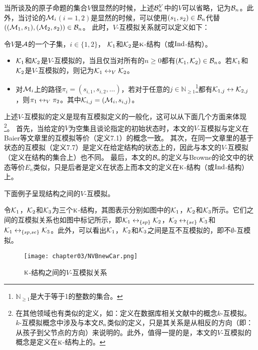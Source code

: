 当所谈及的原子命题的集合$V$很显然的时候，上述${\cal B}_n^V$中的$V$可以省略，记为${\cal B}_n$。此外，当讨论的${\cal M}_i$$(i=1,2)$是显然的时候，可以使用$(s_1,s_2) \in {\cal B}_n$代替$(({\cal M}_1,s_1),({\cal M}_2,s_2)) \in {\cal B}_n$。
此时，$V$-互模拟关系就可以定义如下：
\begin{definition}[$V$-互模拟]\label{def:V-bisimulation}
	令$V$是${\cal A}$的一个子集，$i\in \{1,2\}$， ${\cal K}_1$和${\cal K}_2$是$\textsc{k}$-结构（或$\textrm{Ind}$-结构）。
	\begin{itemize}
		\item ${\cal K}_1$和${\cal K}_2$是$V$-互模拟的，当且仅当对所有的$n \ge 0$都有$({\cal K}_1, {\cal K}_2)\in {\cal B}_n$。若${\cal K}_1$和${\cal K}_2$是$V$-互模拟的，则记为${\cal K}_1 \leftrightarrow_V {\cal K}_2$。
		\item 对${\cal M}_i$上的路径$\pi_i=(s_{i,1},s_{i,2},\dots)$，若对于任意的$j\in \mathbb{N}_{\ge 1}$\footnote{$\mathbb{N}_{\ge 1}$是大于等于1的整数的集合。}都有${\cal K}_{1,j} \leftrightarrow {\cal K}_{2,j}$，则$\pi_1 \leftrightarrow_V \pi_2$。其中${\cal K}_{i, j}=({\cal M}_i, s_{i,j})$。
	\end{itemize}
\end{definition}

上述$V$-互模拟的定义是现有互模拟定义的一般化，这可以从下面几个方面来体现\footnote{在其他领域也有类似的定义，如：定义在数据库相关文献中的概念$k$-互模拟\cite{kaushik2002updates}。$k$-互模拟概念中涉及与本文${\cal B}_n$类似的定义，只是其关系是从相反的方向（即：从孩子到父节点的方向）来说明的。此外，值得一提的是，本文的$V$-互模拟的概念是定义在$\textsc{k}$-结构上的。}。
首先，当给定的$V$为空集且谈论指定的初始状态时，本文的$V$-互模拟与定义在Baier等文章里的互模拟等价（定义7.1\cite{Baier:PMC:2008}）的概念一致。
其次，在同一文章里的基于状态的互模拟（定义7.7\cite{Baier:PMC:2008}）是定义在给定结构的状态上的，因此与本文的$V$-互模拟（定义在结构的集合上）也不同。
最后，本文的${\cal B}_n$的定义与Browne的论文中的状态等价$E_n$类似，只是后者是定义在状态上\cite{browne1988characterizing}而本文的定义在$\textsc{k}$-结构（或$\textrm{Ind}$-结构）上。


下面例子呈现结构之间的$V$-互模拟。
\begin{example}\label{exam:vB}
	令${\cal K}_1$，${\cal K}_2$和${\cal K}_3$为三个$\textsc{k}$-结构，其图表示分别如图中的${\cal K}_1$，${\cal K}_2$和${\cal K}_3$所示。它们之间的互模拟关系也如图中标记所示，即${\cal K}_1 \leftrightarrow_{\{sp\}} {\cal K}_2$，${\cal K}_2 \leftrightarrow_{\{se\}} {\cal K}_3$和${\cal K}_1 \leftrightarrow_{\{sp,se\}} {\cal K}_3$。此外，可以看出${\cal K}_1$，${\cal K}_2$和${\cal K}_3$之间是互不互模拟\cite{Baier:PMC:2008}的，即不$\emptyset$-互模拟。
	\begin{figure*}[!htb]
		\centering
		\texttt{[image: chapter03/NVBnewCar.png]}\\
		\caption{$\textsc{k}$-结构之间的$V$-互模拟关系}
		\label{Fig:chapter05:v1uv2}
	\end{figure*}
\end{example}

